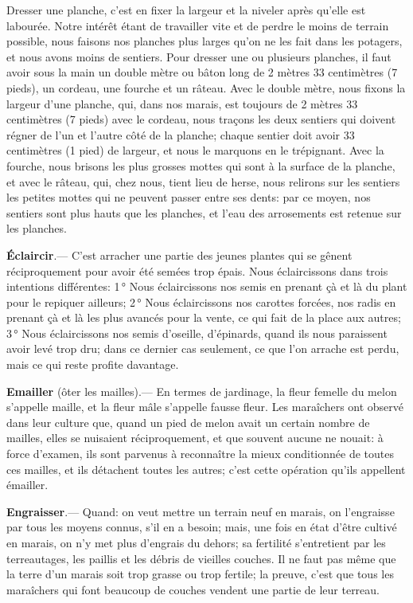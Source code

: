 \documentclass[10pt,a4paper]{book}
\begin{document}
Dresser une planche, c'est en fixer la largeur et la niveler après qu'elle est labourée. Notre intérêt étant de travailler vite et de perdre le moins de terrain possible, nous faisons nos planches plus larges qu'on ne les fait dans les potagers, et nous avons moins de sentiers. Pour dresser une ou plusieurs planches, il faut avoir sous la main un double mètre ou bâton long de 2 mètres 33 centimètres (7 pieds), un cordeau, une fourche et un râteau. Avec le double mètre, nous fixons la largeur d'une planche, qui, dans nos marais, est toujours de 2 mètres 33 centimètres (7 pieds) avec le cordeau, nous traçons les deux sentiers qui doivent régner de l'un et l'autre côté de la planche; chaque sentier doit avoir 33 centimètres (1 pied) de largeur, et nous le marquons en le trépignant. Avec la fourche, nous brisons les plus grosses mottes qui sont à la surface de la planche, et avec le râteau, qui, chez nous, tient lieu de herse, nous relirons sur les sentiers les petites mottes qui ne peuvent passer entre ses dents: par ce moyen, nos sentiers sont plus hauts que les planches, et l'eau des arrosements est retenue sur les planches.

\textbf{Éclaircir}.--- C'est arracher une partie des jeunes plantes qui se gênent réciproquement pour avoir été semées trop épais. Nous éclaircissons dans trois intentions différentes: 1\,° Nous éclaircissons nos semis en prenant çà et là du plant pour le repiquer ailleurs; 2\,° Nous éclaircissons nos carottes forcées, nos radis en prenant çà et là les plus avancés pour la vente, ce qui fait de la place aux autres; 3\,° Nous éclaircissons nos semis d'oseille, d'épinards, quand ils nous paraissent avoir levé trop dru; dans ce dernier cas seulement, ce que l'on arrache est perdu, mais ce qui reste profite davantage.

\textbf{Emailler} (ôter les mailles).--- En termes de jardinage, la fleur femelle du melon s'appelle maille, et la fleur mâle s'appelle fausse fleur. Les maraîchers ont observé dans leur culture que, quand un pied de melon avait un certain nombre de mailles, elles se nuisaient réciproquement, et que souvent aucune ne nouait: à force d'examen, ils sont parvenus à reconnaître la mieux conditionnée de toutes ces mailles, et ils détachent toutes les autres; c'est cette opération qu'ils appellent émailler.

\textbf{Engraisser}.--- Quand: on veut mettre un terrain neuf en marais, on l'engraisse par tous les moyens connus, s'il en a besoin; mais, une fois en état d'être cultivé en marais, on n'y met plus d'engrais du dehors; sa fertilité s'entretient par les terreautages, les paillis et les débris de vieilles couches. Il ne faut pas même que la terre d'un marais soit trop grasse ou trop fertile; la preuve, c'est que tous les maraîchers qui font beaucoup de couches vendent une partie de leur terreau.
\end{document}
